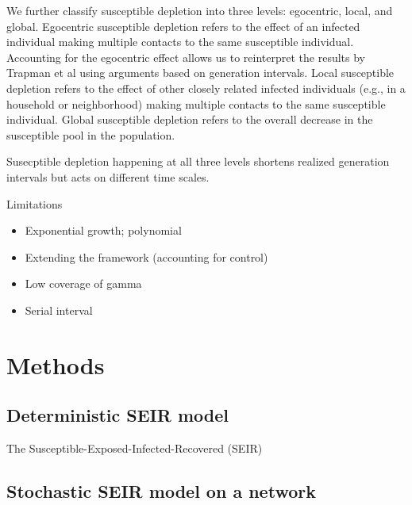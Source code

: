 \documentclass[12pt]{article}
\begin{document}
We further classify susceptible depletion into three levels: egocentric, local, and global.
Egocentric susceptible depletion refers to the effect of an infected individual making multiple contacts to the same susceptible individual.
Accounting for the egocentric effect allows us to reinterpret the results by Trapman et al using arguments based on generation intervals.
Local susceptible depletion refers to the effect of other closely related infected individuals (e.g., in a household or neighborhood) making multiple contacts to the same susceptible individual.
Global susceptible depletion refers to the overall decrease in the susceptible pool in the population.

Susecptible depletion happening at all three levels shortens realized generation intervals but acts on different time scales.




Limitations
\begin{itemize}
	\item Exponential growth; polynomial
	\item Extending the framework (accounting for control)
	\item Low coverage of gamma
	\item Serial interval
\end{itemize}




\section{Methods}

\subsection{Deterministic SEIR model}

The Susceptible-Exposed-Infected-Recovered (SEIR) 

\subsection{Stochastic SEIR model on a network}



\end{document}
